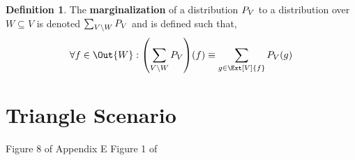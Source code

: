 \documentclass[aps, 10pt, english, twoside, pra, nofootinbib, longbibliography]{revtex4-1}
\theoremstyle{plain}
\theoremstyle{definition}
\newtheorem{definition}[theorem]{Definition}
\theoremstyle{remark}
\newcommand{\term}[1]{\textcolor{Mahogany}{\textbf{#1}}}
\begin{document}
    \begin{definition}
        The \term{marginalization} of a distribution $\prob[V]$ to a distribution over $W \subseteq V$ is denoted $\sum_{V \setminus W} \prob[V]$ and is defined such that,
        \[ \forall f \in \Out{W} : \br{\sum_{V \setminus W} \prob[V]}\br{f} \defined \sum_{g \in \Ext[V]{f}} \prob[V][g] \]
    \end{definition}



    \section{Triangle Scenario}

    Figure 8 of Appendix E \cite{Henson_2014}
    Figure 1 of \cite{Inflation}
\end{document}
